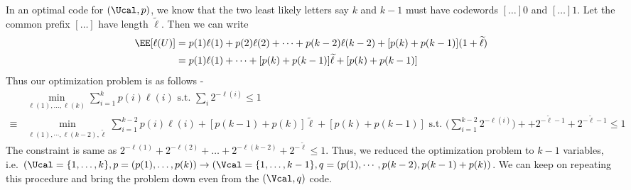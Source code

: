 In an optimal code for $(\Ucal, p)$, we know that the two least likely letters say $k$ and $k-1$ must have codewords $[\dots]0$ and $[\dots]1$. Let the common prefix $[\dots]$ have length $\widetilde{\ell}$. Then we can write
\begin{align*}
\EE[\ell(U)] &= p(1)\ell(1) + p(2)\ell(2) + \cdots + p(k-2)\ell(k-2) + [p(k) + p(k-1)](1+\widetilde{\ell}) \\
&= p(1)\ell(1) + \cdots + [p(k) + p(k-1)]\widetilde{\ell} + [p(k) + p(k-1)] \\
\end{align*}
Thus our optimization problem is as follows - 
\begin{align*}
&\min_{\ell(1), \dots, \ell(k)} \sum_{i=1}^k p(i)\ell(i) \text{ s.t. } \sum_i 2^{-\ell(i)} \leq 1 \\
\equiv &\min_{\ell(1),\cdots,\ell(k-2),\widetilde{\ell}}\sum_{i=1}^{k-2} p(i)\ell(i) + [p(k-1) + p(k)]\widetilde{\ell} + [p(k) + p(k-1)] \text{ s.t. } \Big(\sum_{i=1}^{k-2} 2^{-\ell(i)}\Big)+ + 2^{-\widetilde{\ell} - 1} + 2^{-\widetilde{\ell} - 1} \leq 1
\end{align*}
The constraint is same as $2^{-\ell(1)} + 2^{-\ell(2)} + \dots + 2^{-\ell(k-2)} + 2^{-\widetilde{\ell}} \leq 1$. Thus, we reduced the optimization problem to $k-1$ variables, i.e. $(\Ucal=\{1,\dots,k\}, p=(p(1),\dots,p(k)) \to (\Vcal=\{1,\dots,k-1\}, q=(p(1),\cdots,p(k-2),p(k-1)+p(k))$. We can keep on repeating this procedure and bring the problem down even from the $(\Vcal, q)$ code. 
